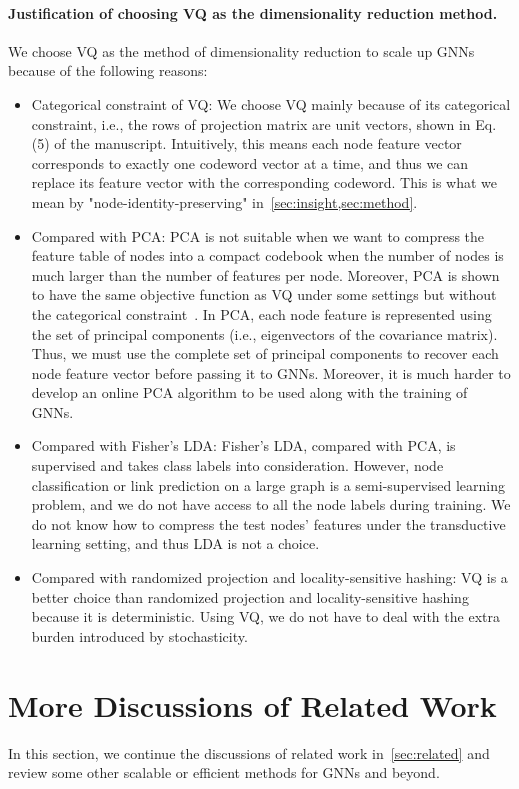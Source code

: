 \documentclass{article}
\newcommand{\cm}{\paragraph}
\begin{document}
\cm{Justification of choosing VQ as the dimensionality reduction method.}
We choose VQ as the method of dimensionality reduction to scale up GNNs because of the following reasons:
\begin{itemize}[leftmargin=*, topsep=1.5pt]
\setlength\itemsep{0.75pt}
    \item Categorical constraint of VQ: We choose VQ mainly because of its categorical constraint, i.e., the rows of projection matrix  are unit vectors, shown in Eq. (5) of the manuscript. Intuitively, this means each node feature vector corresponds to exactly one codeword vector at a time, and thus we can replace its feature vector with the corresponding codeword. This is what we mean by "node-identity-preserving" in~\cref{sec:insight,sec:method}.
    \item Compared with PCA: PCA is not suitable when we want to compress the feature table of  nodes into a compact codebook when the number of nodes  is much larger than the number of features per node. Moreover, PCA is shown to have the same objective function as VQ under some settings but without the categorical constraint~\citep{ding2004k}. In PCA, each node feature is represented using the set of principal components (i.e., eigenvectors of the covariance matrix). Thus, we must use the complete set of principal components to recover each node feature vector before passing it to GNNs. Moreover, it is much harder to develop an online PCA algorithm to be used along with the training of GNNs.
    \item Compared with Fisher's LDA: Fisher's LDA, compared with PCA, is supervised and takes class labels into consideration. However, node classification or link prediction on a large graph is a semi-supervised learning problem, and we do not have access to all the node labels during training. We do not know how to compress the test nodes' features under the transductive learning setting, and thus LDA is not a choice.
    \item Compared with randomized projection and locality-sensitive hashing: VQ is a better choice than randomized projection and locality-sensitive hashing because it is deterministic. Using VQ, we do not have to deal with the extra burden introduced by stochasticity.
\end{itemize}



\section{More Discussions of Related Work}
\label{apd:related}
In this section, we continue the discussions of related work in~\cref{sec:related} and review some other scalable or efficient methods for GNNs and beyond.
\end{document}
